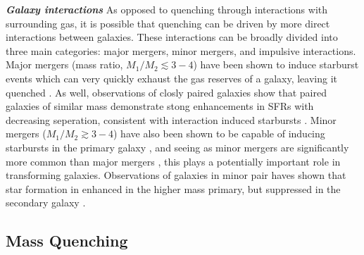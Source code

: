 \noindent \textit{\textbf{Galaxy interactions}}
\smallskip
\newline
As opposed to quenching through interactions with surrounding gas, it
is possible that quenching can be driven by more direct interactions
between galaxies.  These interactions can be broadly divided into
three main categories: major mergers, minor mergers, and impulsive
interactions.  Major mergers (mass ratio, $M_1/M_2 \lesssim 3-4$) have
been shown to induce starburst events which can very quickly exhaust the gas
reserves of a galaxy, leaving it quenched \citep[e.g.][]{mihos1994b}.
As well, observations of closly paired galaxies show that paired
galaxies of similar mass demonstrate stong enhancements in SFRs with
decreasing seperation, consistent with interaction induced starbursts
\citep{ellison2008, davies2015}.  Minor mergers ($M_1/M_2 \gtrsim
3-4$) have also been shown to be capable of inducing starbursts in the
primary galaxy \citep[e.g.][]{mihos1994a}, and seeing as minor mergers
are significantly more common than major mergers \citep{lotz2011},
this plays a potentially important role in transforming galaxies.
Observations of galaxies in minor pair haves shown that star formation
in enhanced in the higher mass primary, but suppressed in the
secondary galaxy \citep{davies2015}.  

\subsection{Mass Quenching}
\label{mass_quench}

%


